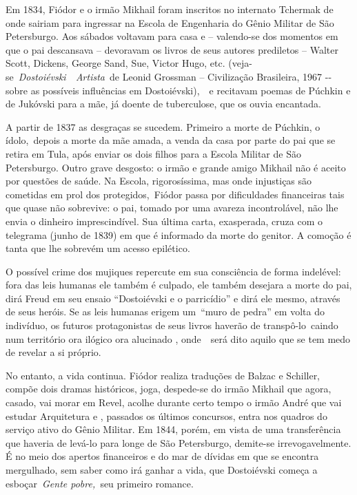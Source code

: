Em 1834, Fiódor e o irmão Mikhail foram inscritos no internato Tchermak
de onde sairiam para ingressar na Escola de Engenharia do Gênio Militar
de São Petersburgo. Aos sábados voltavam para casa e -- valendo-se dos
momentos em que o pai descansava -- devoravam os livros de seus autores
prediletos -- Walter Scott, Dickens, George Sand, Sue, Victor Hugo, etc.
(veja-se~\emph{Dostoiévski~~Artista}~de Leonid Grossman -- Civilização
Brasileira, 1967 -\/- sobre as possíveis influências em Dostoiévski),~~e
recitavam poemas de Púchkin e de Jukóvski para a mãe, já doente de
tuberculose, que os ouvia encantada.

A partir de 1837 as desgraças se sucedem. Primeiro a morte de Púchkin, o
ídolo,~depois a morte da mãe amada, a venda da casa por parte do pai que
se retira em Tula, após enviar os dois filhos para a Escola Militar de
São Petersburgo. Outro grave desgosto: o irmão e grande amigo Mikhail
não é aceito por questões de saúde. Na Escola, rigorosíssima, mas onde
injustiças são cometidas em prol dos protegidos,~Fiódor passa por
dificuldades financeiras tais que quase não sobrevive: o pai, tomado por
uma avareza incontrolável, não lhe envia o dinheiro imprescindível. Sua
última carta, exasperada, cruza com o telegrama (junho de 1839) em que é
informado da morte do genitor. A comoção é tanta que lhe sobrevém um
acesso epilético.

O possível crime dos mujiques repercute em sua consciência de forma
indelével: fora das leis humanas ele também é culpado, ele também
desejara a morte do pai, dirá Freud em seu ensaio ``Dostoiévski e o
parricídio'' e dirá ele mesmo, através de seus heróis. Se as leis
humanas erigem um~``muro de pedra'' em volta do indivíduo, os futuros
protagonistas de seus livros haverão de transpô-lo~caindo num território
ora ilógico ora alucinado , onde~~será dito aquilo que se tem medo de
revelar a si próprio.

No entanto, a vida continua. Fiódor realiza traduções de Balzac e
Schiller, compõe dois dramas históricos, joga, despede-se do irmão
Mikhail que agora, casado, vai morar em Revel, acolhe durante certo
tempo o irmão André que vai estudar Arquitetura e , passados os últimos
concursos, entra nos quadros do serviço ativo do Gênio Militar. Em 1844,
porém, em vista de uma transferência que haveria de levá-lo para longe
de São Petersburgo, demite-se irrevogavelmente. É no meio dos apertos
financeiros e do mar de dívidas em que se encontra mergulhado, sem saber
como irá ganhar a vida, que Dostoiévski começa a esboçar~\emph{Gente
pobre,~}seu primeiro romance.

